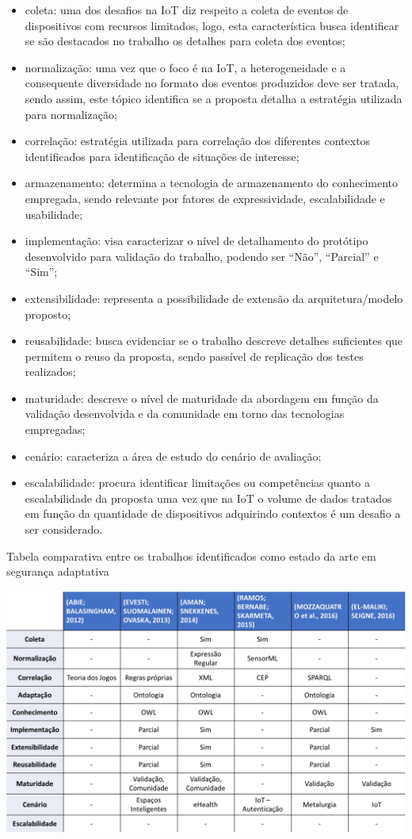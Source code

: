 \documentclass[tid,table]{texufpel} %
\begin{document}
\begin{itemize}
\item coleta: uma dos desafios na IoT diz respeito a coleta de eventos de dispositivos com recursos limitados, logo, esta característica busca identificar se são destacados no trabalho os detalhes para coleta dos eventos;
\item normalização: uma vez que o foco é na IoT, a heterogeneidade e a consequente diversidade no formato dos eventos produzidos deve ser tratada, sendo assim, este tópico identifica se a proposta detalha a estratégia utilizada para normalização;
\item correlação: estratégia utilizada para correlação dos diferentes contextos identificados para identificação de situações de interesse;
\item armazenamento: determina a tecnologia de armazenamento do conhecimento empregada, sendo relevante por fatores de expressividade, escalabilidade e usabilidade;
\item implementação: visa caracterizar o nível de detalhamento do protótipo desenvolvido para validação do trabalho, podendo ser 
``Não'', ``Parcial'' e ``Sim'';
\item extensibilidade: representa a possibilidade de extensão da arquitetura/modelo proposto;
\item reusabilidade: busca evidenciar se o trabalho descreve detalhes suficientes que permitem o reuso da proposta, sendo passível de replicação dos testes realizados;
\item maturidade: descreve o nível de maturidade da abordagem em função da validação desenvolvida e da comunidade em torno das tecnologias empregadas;
\item cenário: caracteriza a área de estudo do cenário de avaliação;
\item escalabilidade: procura identificar limitações ou competências quanto a escalabilidade da proposta uma vez que na IoT o volume de dados tratados em função da quantidade de dispositivos adquirindo contextos é um desafio a ser considerado.
\end{itemize}

\begin{table}[ht]
\centering
\caption{Tabela comparativa entre os trabalhos identificados como estado da arte em segurança adaptativa}
\includegraphics[width=1.0\textwidth]{imagens/comparacao-estado-da-arte.png}
\label{comparacao-estado-da-arte}
\end{table}
\end{document}
